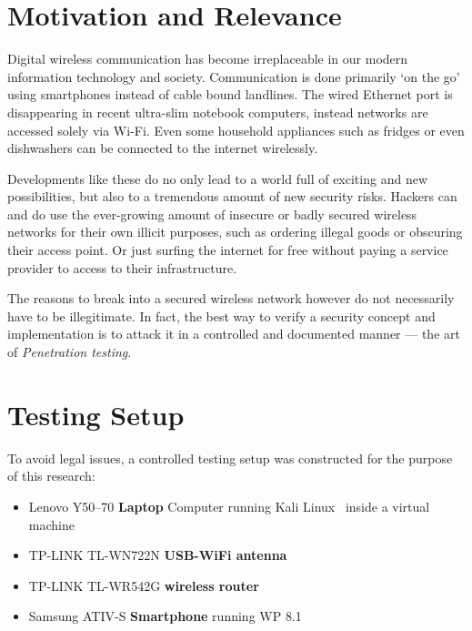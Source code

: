 \section{Motivation and Relevance}

Digital wireless communication has become irreplaceable in our modern information technology and society. Communication is done primarily `on the go' using smartphones instead of cable bound landlines. The wired Ethernet port is disappearing in recent ultra-slim notebook computers, instead networks are accessed solely via Wi-Fi. Even some household appliances such as fridges or even dishwashers can be connected to the internet wirelessly.

Developments like these do no only lead to a world full of exciting and new possibilities, but also to a tremendous amount of new security risks. Hackers can and do use the ever-growing amount of insecure or badly secured wireless networks for their own illicit purposes, such as ordering illegal goods or obscuring their access point. Or just surfing the internet for free without paying a service provider to access to their infrastructure.  

The reasons to break into a secured wireless network however do not necessarily have to be illegitimate. In fact, the best way to verify a security concept and implementation is to attack it in a controlled and documented manner --- the art of \emph{Penetration testing}.

\section{Testing Setup}

To avoid legal issues, a controlled testing setup was constructed for the purpose of this research:

\begin{itemize}

\item{Lenovo Y50--70 \textbf{Laptop} Computer running Kali Linux~\cite{OffSec17} inside a virtual machine}

\item{TP-LINK TL-WN722N \textbf{USB-WiFi antenna}}

\item{TP-LINK TL-WR542G \textbf{wireless router}}

\item{Samsung ATIV-S \textbf{Smartphone} running WP 8.1}

\end{itemize}

